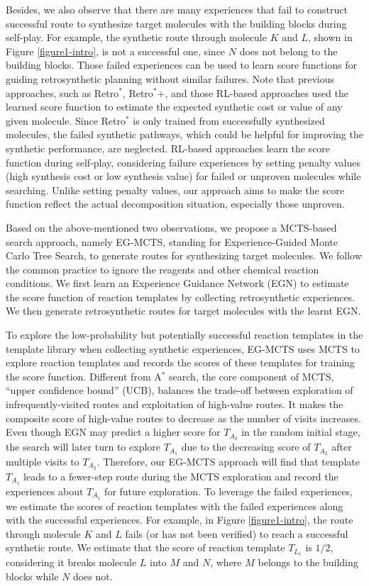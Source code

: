\documentclass[sn-mathphys,Numbered]{sn-jnl}
\begin{document}
Besides, we also observe that there are many experiences that fail to construct successful route to synthesize target molecules with the building blocks during self-play. For example, the synthetic route through molecule $K$ and $L$, shown in Figure \ref{figure1-intro}, is not a successful one, since $N$ does not belong to the building blocks. Those failed experiences can be used to learn score functions for guiding retrosynthetic planning without similar failures.
Note that previous approaches, such as Retro$^*$, Retro$^*$+, and those RL-based approaches \citep{schreck2019, RL2} used the learned score function to estimate the expected synthetic cost or value of any given molecule. 
Since Retro$^*$ is only trained from successfully synthesized molecules, the failed synthetic pathways, which could be helpful for improving the synthetic performance, are neglected. 
RL-based approaches learn the score function during self-play, considering failure experiences by setting penalty values (high synthesis cost or low synthesis value) for failed or unproven molecules while searching.
Unlike setting penalty values, our approach aims to make the score function reflect the actual decomposition situation, especially those unproven.

Based on the above-mentioned two observations, we propose a MCTS-based search approach, namely EG-MCTS, standing for Experience-Guided Monte Carlo Tree Search, to generate routes for synthesizing target molecules. We follow the common practice to ignore the reagents and other chemical reaction conditions. We first learn an Experience Guidance Network (EGN) to estimate the score function of reaction templates by collecting retrosynthetic experiences. We then generate retrosynthetic routes for target molecules with the learnt EGN. 

To explore the low-probability but potentially successful reaction templates in the template library when collecting synthetic experiences, EG-MCTS uses MCTS to explore reaction templates and records the scores of these templates for training the score function. 
Different from A$^*$ search, the core component of MCTS, “upper confidence bound” (UCB), balances the trade-off between exploration of infrequently-visited routes and exploitation of high-value routes. It makes the composite score of high-value routes to decrease as the number of visits increases.
Even though EGN may predict a higher score for $T_{A_2}$ in the random initial stage, the search will later turn to explore $T_{A_1}$ due to the decreasing score of  $T_{A_2}$ after multiple visits to $T_{A_2}$. 
Therefore, our EG-MCTS approach will find that template $T_{A_1}$ leads to a fewer-step route during the MCTS exploration and record the experiences about $T_{A_1}$ for future exploration.
To leverage the failed experiences, we estimate the scores of reaction templates with the failed experiences along with the successful experiences. For example, in Figure \ref{figure1-intro}, the route through molecule $K$ and $L$ fails (or has not been verified) to reach a successful synthetic route. We estimate that the score of reaction template $T_{L_1}$ is $1/2$, considering it breaks molecule $L$ into $M$ and $N$, where $M$ belongs to the building blocks while $N$ does not.
\end{document}
